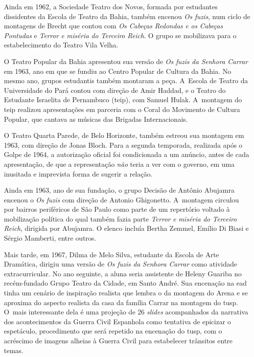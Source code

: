 {Ainda em 1962, a Sociedade Teatro dos Novos, formada por estudantes
dissidentes da Escola de Teatro da Bahia, também encenou {\it Os fuzis},
num ciclo de montagens de Brecht que contou com {\it Os Cabeças Redondas
e os Cabeças Pontudas} e {\it Terror e miséria do Terceiro Reich}. O
grupo se mobilizava para o estabelecimento do Teatro Vila Velha.

O Teatro Popular da Bahia apresentou sua versão de {\it Os fuzis da
Senhora Carrar} em 1963, ano em que se fundiu ao Centro Popular de
Cultura da Bahia. No mesmo ano, grupos estudantis também montaram a
peça. A~Escola de Teatro da Universidade do Pará contou com direção de
Amir Haddad, e o Teatro do Estudante Israelita de Pernambuco ({\sc teip}), com
Samuel Hulak. A~montagem do {\sc teip} realizou apresentações em parceria com
o Coral do Movimento de Cultura Popular, que cantava as músicas das
Brigadas Internacionais.

O Teatro Quarta Parede, de Belo Horizonte, também estreou sua montagem
em 1963, com direção de Jonas Bloch. Para a segunda temporada, realizada
após o Golpe de 1964, a autorização oficial foi condicionada a um
anúncio, antes de cada apresentação, de que a representação {\it não}
teria a ver com o governo, em uma inusitada e imprevista forma de
sugerir a relação.

Ainda em 1963, ano de sua fundação, o grupo Decisão de Antônio Abujamra
encenou o {\it Os fuzis} com direção de Antonio Ghigonetto. A~montagem
circulou por bairros periféricos de São Paulo como parte de um
repertório voltado à mobilização política do qual também fazia parte
{\it Terror e miséria do Terceiro Reich}, dirigida por Abujamra. O
elenco incluía Bertha Zemmel, Emílio Di Biasi e Sérgio Mamberti, entre
outros.

Mais tarde, em 1967, Dilma de Melo Silva, estudante da Escola de Arte
Dramática, dirigiu uma versão de {\it Os fuzis da Senhora Carrar} como
atividade extracurricular. No ano seguinte, a aluna seria assistente de
Heleny Guariba no recém-fundado Grupo Teatro da Cidade, em Santo André.
Sua encenação na {\sc ead} tinha um cenário de inspiração realista que lembra
o da montagem do Arena e se aproxima do aspecto realista da casa da
família Carrar na montagem do {\sc tusp}. O~mais interessante dela é uma
projeção de 26 {\it slides} acompanhados da narrativa dos acontecimentos
da Guerra Civil Espanhola como tentativa de epicizar o espetáculo,
procedimento que será repetido na encenação do {\sc tusp}, com o acréscimo de
imagens alheias à Guerra Civil para estabelecer trânsitos entre temas.

}
